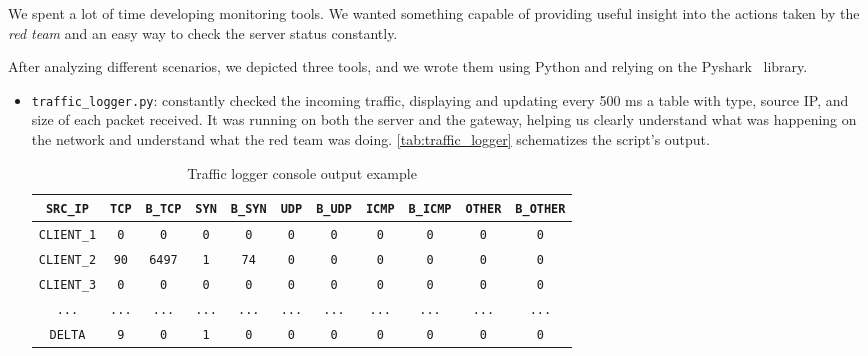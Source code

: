 We spent a lot of time developing monitoring tools. We wanted something capable of providing useful insight into the actions taken by the \textit{red team} and an easy way to check the server status constantly. 

After analyzing different scenarios, we depicted three tools, and we wrote them using Python and relying on the Pyshark~\cite{github:pyshark} library.

\begin{itemize}
    \item \texttt{traffic\_logger.py}: constantly checked the incoming traffic, displaying and updating every 500 ms a table with type, source IP, and size of each packet received. It was running on both the server and the gateway, helping us clearly understand what was happening on the network and understand what the red team was doing. \autoref{tab:traffic_logger} schematizes the script's output.
    \begin{table}[ht]
        \centering
        \begin{tabular}{|c|c|c|c|c|c|c|c|c|c|c|}
            \hline
            \texttt{SRC\_IP} & \texttt{TCP} & \texttt{B\_TCP} & \texttt{SYN} & \texttt{B\_SYN} & \texttt{UDP} & \texttt{B\_UDP} & \texttt{ICMP} & \texttt{B\_ICMP} & \texttt{OTHER} & \texttt{B\_OTHER} \\
            \hline
            \texttt{CLIENT\_1} & \texttt{0} & \texttt{0} & \texttt{0} & \texttt{0} & \texttt{0} & \texttt{0} & \texttt{0} & \texttt{0} & \texttt{0} & \texttt{0} \\
            \hline
            \texttt{CLIENT\_2} & \texttt{90} & \texttt{6497} & \texttt{1} & \texttt{74} & \texttt{0} & \texttt{0} & \texttt{0} & \texttt{0} & \texttt{0} & \texttt{0} \\
            \hline
            \texttt{CLIENT\_3} & \texttt{0} & \texttt{0} & \texttt{0} & \texttt{0} & \texttt{0} & \texttt{0} & \texttt{0} & \texttt{0} & \texttt{0} & \texttt{0} \\
            \hline
            \texttt{...} & \texttt{...} & \texttt{...} & \texttt{...} & \texttt{...} & \texttt{...} & \texttt{...} & \texttt{...} & \texttt{...} & \texttt{...} & \texttt{...} \\
            \hline\texttt{DELTA} & \texttt{9} & \texttt{0} & \texttt{1} & \texttt{0} & \texttt{0} & \texttt{0} & \texttt{0} & \texttt{0} & \texttt{0} & \texttt{0} \\
            \hline
        \end{tabular}
        \captionsetup{justification=centering}
        \caption{Traffic logger console output example}
        \label{tab:traffic_logger}
    \end{table}


\end{itemize}
